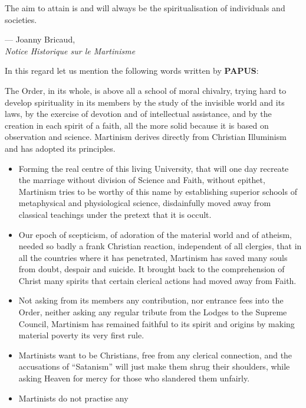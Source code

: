 \begin{quotebox}
    The aim to attain is and will always be the spiritualisation of individuals and societies.
\end{quotebox}
\begin{flushright}
    --- Joanny Bricaud,\\\textit{Notice Historique sur le Martinisme}
\end{flushright}

In this regard let us mention the following words written by \textbf{PAPUS}:

\begin{quotebox}
    The Order, in its whole, is above all a school of moral chivalry, trying hard
to develop spirituality in its members by the study of the invisible world and its
laws, by the exercise of devotion and of intellectual assistance, and by the creation
in each spirit of a faith, all the more solid because it is based on observation and
science. Martinism derives directly from Christian Illuminism and has adopted its
principles.
\begin{itemize}
    \item Forming the real centre of this living University, that will one day
recreate the marriage without division of Science and Faith, without epithet,
Martinism tries to be worthy of this name by establishing superior schools of
metaphysical and physiological science, disdainfully moved away from classical
teachings under the pretext that it is occult.
    \item Our epoch of scepticism, of
adoration of the material world and of atheism, needed so badly a frank Christian
reaction, independent of all clergies, that in all the countries where it has
penetrated, Martinism has saved many souls from doubt, despair and suicide. It
brought back to the comprehension of Christ many spirits that certain clerical
actions had moved away from Faith.
    \item Not asking from its members any
contribution, nor entrance fees into the Order, neither asking any regular tribute
from the Lodges to the Supreme Council, Martinism has remained faithful to its
spirit and origins by making material poverty its very first rule.
    \item Martinists want
to be Christians, free from any clerical connection, and the accusations of
``Satanism'' will just make them shrug their shoulders, while asking Heaven for
mercy for those who slandered them unfairly.
    \item Martinists do not practise any

\end{itemize}
\end{quotebox}
